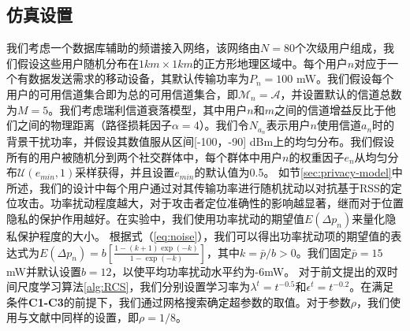 \subsection{仿真设置}
我们考虑一个数据库辅助的频谱接入网络，该网络由$N=80$个次级用户组成，我们假设这些用户随机分布在$1km \times 1km$的正方形地理区域中。每个用户$n$对应于一个有数据发送需求的移动设备，其默认传输功率为$P_n=100$ mW\cite{FCCApril52012}。我们假设每个用户的可用信道集合即为总的可用信道集合，即$\mathcal{M}_n=\mathcal{A}$，并设置默认的信道总数为$M=5$。我们考虑瑞利信道衰落模型，其中用户$n$和$m$之间的信道增益反比于他们之间的物理距离（路径损耗因子$\alpha = 4$）。我们令$N_{a_n}$表示用户$n$使用信道$a_n$时的背景干扰功率，并假设其数值服从区间[-100，-90] dBm上的均匀分布。我们假设所有的用户被随机分到两个社交群体中，每个群体中用户$n$的权重因子$e_{n}$从均匀分布$\mathcal{U}(e_{min},1)$采样获得，并且设置$e_{min}$的默认值为0.5。
如节\ref{sec:privacy-model}中所述，我们的设计中每个用户通过对其传输功率进行随机扰动以对抗基于RSS的定位攻击。功率扰动程度越大，对于攻击者定位准确性的影响越显著，继而对于位置隐私的保护作用越好。在实验中，我们使用功率扰动的期望值$E(\Delta p_n)$来量化隐私保护程度的大小。
根据式（\ref{eq:noise}），我们可以得出功率扰动项的期望值的表达式为$E(\Delta p_n)=b\left[\frac{1-(k+1)\exp(-k)}{1-\exp(-k)}\right]$，其中$k=\bar{p}/b>0$。我们固定$\bar{p}=15$ mW并默认设置$b=12$，以使平均功率扰动水平约为-6mW。
对于前文提出的双时间尺度学习算法\ref{alg:RCS}，我们分别设置学习率为$\lambda^t=t^{-0.5}$和$\epsilon^t=t^{-0.2}$。在满足条件\textbf{C1-C3}的前提下，我们通过网格搜索确定超参数的取值。对于参数$\rho$，我们使用与文献\cite{Hart_areinforcement}中同样的设置，即$\rho=1/8$。
